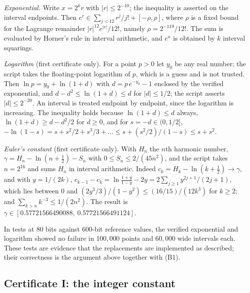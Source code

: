 \emph{Exponential.} Write $x=2^kr$ with $|r|\le2^{-10}$; the inequality is asserted on the
interval endpoints. Then $e^r\in\sum_{j<12}r^j/j!+[-\rho,\rho]$, where $\rho$ is a fixed bound
for the Lagrange remainder $|r|^{12}e^{|r|}/12!$, namely $\rho=2^{-119}/12!$. The sum is
evaluated by Horner's rule in
interval arithmetic, and $e^x$ is obtained by $k$ interval squarings.

\emph{Logarithm} (first certificate only). For a point $p>0$ let $y_0$ be any real number; the
script takes the floating-point logarithm of $p$, which is a guess and is not trusted. Then
$\ln p=y_0+\ln(1+d)$ with $d=p\,e^{-y_0}-1$ enclosed by the verified exponential, and
$d-d^2\le\ln(1+d)\le d$ for $|d|\le1/2$; the script asserts $|d|\le2^{-20}$. An interval is
treated endpoint by endpoint, since the logarithm is increasing. The inequality holds because
$\ln(1+d)\le d$ always, $\ln(1+d)\ge d-d^2/2$ for $d\ge0$, and for $s=-d\in(0,1/2]$,
$-\ln(1-s)=s+s^2/2+s^3/3+\dots\le s+(s^2/2)/(1-s)\le s+s^2$.

\emph{Euler's constant} (first certificate only). With $H_n$ the $n$th harmonic number,
$\gamma=H_n-\ln(n+\tfrac12)-S_n$ with $0\le S_n\le2/(45n^2)$, and the script takes $n=2^{16}$
and sums $H_n$ in interval arithmetic. Indeed $c_k=H_k-\ln(k+\tfrac12)\to\gamma$, and with
$y=1/(2k)$, $c_{k-1}-c_k=\ln\frac{1+y}{1-y}-2y=2\sum_{j\ge1}y^{2j+1}/(2j+1)$, which lies
between $0$ and $(2y^3/3)/(1-y^2)\le(16/15)/(12k^3)$ for $k\ge2$; and
$\sum_{k>n}k^{-3}\le1/(2n^2)$. The result is
$\gamma\in[0.57721566490088,\ 0.57721566491124]$.

In tests at $80$ bits against $600$-bit reference values, the verified exponential and
logarithm showed no failure in $100{,}000$ points and $60{,}000$ wide intervals each. These
tests are evidence that the replacements are implemented as described; their correctness is
the argument above together with (B1).

\subsection{Certificate I: the integer constant}\label{sec:certificates-I}

